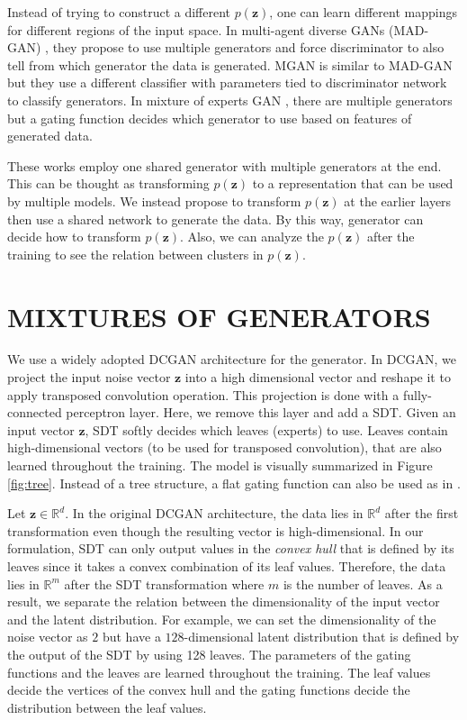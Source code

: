 \documentclass[a4paper,onesided,12pt]{report}
\begin{document}
Instead of trying to construct a different $p(\boldsymbol{z})$, one can learn different mappings for different regions of the input space. In multi-agent diverse GANs (MAD-GAN) \cite{madgan}, they propose to use multiple generators and force discriminator to also tell from which generator the data is generated.  MGAN \cite{mgan} is similar to MAD-GAN but they use a different classifier with parameters tied to discriminator network to classify generators. In mixture of experts GAN \cite{megan}, there are multiple generators but a gating function decides which generator to use based on features of generated data.

These works employ one shared generator with multiple generators at the end. This can be thought as transforming $p(\boldsymbol{z})$ to a representation that can be used by multiple models. We instead propose to transform $p(\boldsymbol{z})$ at the earlier layers then use a shared network to generate the data. By this way, generator can decide how to transform $p(\boldsymbol{z})$. Also, we can analyze the $p(\boldsymbol{z})$ after the training to see the relation between clusters in $p(\boldsymbol{z})$.

\chapter{MIXTURES OF GENERATORS}
\label{chapter:me}

\lipsum[5]

We use a widely adopted DCGAN \cite{dcgan} architecture for the generator. In DCGAN, we project the input noise vector $\boldsymbol{z}$ into a high dimensional vector and reshape it to apply transposed convolution operation. This projection is done with a fully-connected perceptron layer. Here, we remove this layer and add a SDT. Given an input vector $\boldsymbol{z}$, SDT softly decides which leaves (experts) to use. Leaves contain high-dimensional vectors (to be used for transposed convolution), that are also learned throughout the training. The model is visually summarized in Figure \ref{fig:tree}. Instead of a tree structure, a flat gating function can also be used as in \cite{me}.

Let $\boldsymbol{z} \in \mathbb{R}^{d}$. In the original DCGAN architecture, the data lies in $\mathbb{R}^{d}$ after the first transformation even though the resulting vector is high-dimensional. In our formulation, SDT can only output values in the \emph{convex hull} that is defined by its leaves since it takes a convex combination of its leaf values. Therefore, the data lies in $\mathbb{R}^m$ after the SDT transformation where $m$ is the number of leaves. As a result, we separate the relation between the dimensionality of the input vector and the latent distribution. For example, we can set the dimensionality of the noise vector as $2$ but have a $128$-dimensional latent distribution that is defined by the output of the SDT by using 128 leaves. The parameters of the gating functions and the leaves are learned throughout the training. The leaf values decide the vertices of the convex hull and the gating functions decide the distribution between the leaf values.
\end{document}
